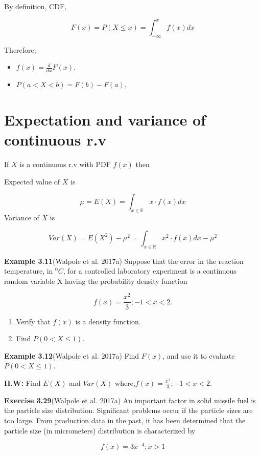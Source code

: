 \documentclass[
  11pt,
  letterpaper,
  DIV=11,
  numbers=noendperiod]{scrreprt}
\providecommand{\tightlist}{%
  \setlength{\itemsep}{0pt}\setlength{\parskip}{0pt}}
\begin{document}
By definition, CDF,

\[F(x)=P(X\le x)= \int_{-\infty}^{x} f(x)dx\]

Therefore,

\begin{itemize}
\item
  \(f(x)=\frac{d}{dx} F(x)\).
\item
  \(P(a<X<b)=F(b)-F(a)\).
\end{itemize}

\section{\texorpdfstring{\textbf{Expectation and variance of continuous
r.v}}{Expectation and variance of continuous r.v}}\label{expectation-and-variance-of-continuous-r.v}

If \(X\) is a continuous r.v with PDF \(f(x)\) then

Expected value of \(X\) is

\[\mu=E(X)= \int_{x\in \mathbb{R}} x\cdot f(x)dx\] Variance of \(X\) is

\[Var(X)=E(X^2)-\mu^2=\int_{x\in \mathbb{R}} x^2\cdot f(x)dx-\mu^2\]

\textbf{Example 3.11}(Walpole et al. 2017a) Suppose that the error in
the reaction temperature, in \(^0C\), for a controlled laboratory
experiment is a continuous random variable X having the probability
density function

\[f(x)=\frac{x^2}{3}; -1<x<2.\]

\begin{enumerate}
\def\labelenumi{(\alph{enumi})}
\tightlist
\item
  Verify that \(f(x)\) is a density function.
\item
  Find \(P(0< X \le 1)\).
\end{enumerate}

\textbf{Example 3.12}(Walpole et al. 2017a) Find \(F(x)\), and use it to
evaluate \(P(0 < X\le1)\).

\textbf{H.W:} Find \(E(X)\) and \(Var(X)\)
where,\(f(x)=\frac{x^2}{3}; -1<x<2\).

\textbf{Exercise 3.29}(Walpole et al. 2017a) An important factor in
solid missile fuel is the particle size distribution. Significant
problems occur if the particle sizes are too large. From production data
in the past, it has been determined that the particle size (in
micrometers) distribution is characterized by

\[f(x)=3x^{-4}; x> 1\]
\end{document}
